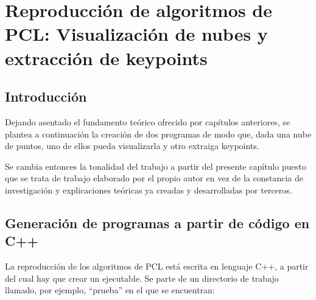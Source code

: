 \chapter{Reproducción de algoritmos de PCL: Visualización de nubes y extracción de keypoints}

\section{Introducción}
Dejando asentado el fundamento teórico ofrecido por capítulos anteriores, se plantea a continuación la creación de dos programas de modo que, dada una nube de puntos, uno de ellos pueda visualizarla y otro extraiga keypoints.

Se cambia entonces la tonalidad del trabajo a partir del presente capítulo puesto que se trata de trabajo elaborado por el propio autor en vez de la constancia de investigación y explicaciones teóricas ya creadas y desarrolladas por terceros.

\section{Generación de programas a partir de código en C++}
La reproducción de los algoritmos de PCL está escrita en lenguaje C++, a partir del cual hay que crear un ejecutable. Se parte de un directorio de trabajo llamado, por ejemplo, ``prueba'' en el que se encuentran:

